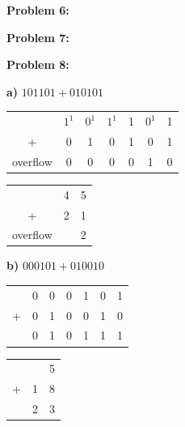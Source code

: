 \documentclass{article}
\begin{document}
    \quad\quad
    \noindent{}

    \textbf{Problem 6:}

    \quad\quad
    \noindent{}

    \textbf{Problem 7:}

    \quad\quad
    \noindent{}

    \textbf{Problem 8:}

    \quad \textbf{a)} $101101+010101$

    \begin{center}
        \begin{tabular}{ ccccccc }
            & $1^1$ & $0^1$ & $1^1$ & 1 & $0^1$ & 1 \\
            + & 0   & 1   & 0   & 1 & 0   & 1 \\
            \hline
            overflow & 0 & 0 & 0 & 0 & 1 & 0
        \end{tabular}
        \quad\quad 
        \begin{tabular}{ ccc }
            & 4 & 5 \\
            + & 2 & 1 \\
            \hline
            overflow & & 2
        \end{tabular}
    \end{center}

    \quad \textbf{b)} $000101 + 010010$

    \begin{center}
        \begin{tabular}{ ccccccc }
              & 0 & 0 & 0 & 1 & 0 & 1 \\
            + & 0 & 1 & 0 & 0 & 1 & 0 \\
            \hline
            & 0 & 1 & 0 & 1 & 1 & 1
        \end{tabular}
        \quad\quad 
        \begin{tabular}{ ccc }
            & & 5 \\
            + & 1 & 8 \\
            \hline
            & 2 & 3
        \end{tabular}
    \end{center}
\end{document}
